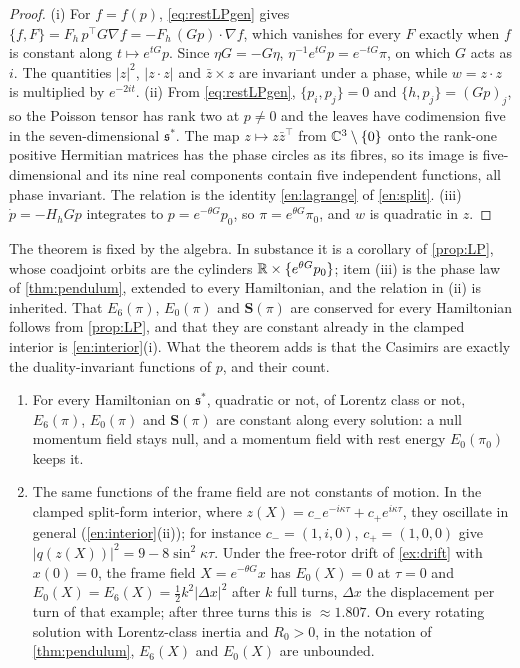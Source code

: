 \begin{proof}
(i) For $f=f(p)$, \eqref{eq:restLPgen} gives $\{f,F\}=F_h\,p^{\!\top}G\nabla f=-F_h\,(Gp)\cdot\nabla f$, which vanishes for every $F$ exactly when $f$
is constant along $t\mapsto e^{tG}p$. Since $\eta G=-G\eta$, $\eta^{-1}e^{tG}p=e^{-tG}\pi$, on which $G$ acts as $i$. The quantities $|z|^2$,
$|z\cdot z|$ and $\bar z\times z$ are invariant under a phase, while $w=z\cdot z$ is multiplied by $e^{-2it}$. (ii) From \eqref{eq:restLPgen},
$\{p_i,p_j\}=0$ and $\{h,p_j\}=(Gp)_j$, so the Poisson tensor has rank two at $p\neq0$ and the leaves have codimension five in the
seven-dimensional $\mathfrak s^*$. The map $z\mapsto z\bar z^{\!\top}$ from $\mathbb{C}^3\setminus\{0\}$ onto the rank-one positive Hermitian matrices has the
phase circles as its fibres, so its image is five-dimensional and its nine real components contain five independent functions, all phase
invariant. The relation is the identity \eqref{en:lagrange} of \cref{en:split}. (iii) $\dot p=-H_hGp$ integrates to
$p=e^{-\theta G}p_0$, so $\pi=e^{\theta G}\pi_0$, and $w$ is quadratic in $z$.
\end{proof}

The theorem is fixed by the algebra. In substance it is a corollary of \cref{prop:LP}, whose coadjoint orbits are the cylinders
$\mathbb{R}\times\{e^{\theta G}p_0\}$; item (iii) is the phase law of \cref{thm:pendulum}, extended to every Hamiltonian, and the relation in (ii) is
inherited. That $E_6(\pi)$, $E_0(\pi)$ and $\mathbf S(\pi)$ are conserved for every Hamiltonian follows from \cref{prop:LP}, and that they are constant already in the clamped
interior is \cref{en:interior}(i). What the theorem adds is that the Casimirs are exactly the duality-invariant functions of $p$, and their count.

\begin{corollary}
\label{cl:nogen}
\begin{enumerate}[label=(\roman*),leftmargin=2.2em]
\item For every Hamiltonian on $\mathfrak s^*$, quadratic or not, of Lorentz class or not, $E_6(\pi)$, $E_0(\pi)$ and $\mathbf S(\pi)$ are constant
along every solution: a null momentum field stays null, and a momentum field with rest energy $E_0(\pi_0)$ keeps it.
\item The same functions of the frame field are not constants of motion. In the clamped split-form interior, where
$z(X)=c_-e^{-i\kappa\tau}+c_+e^{i\kappa\tau}$, they oscillate in general (\cref{en:interior}(ii)); for instance $c_-=(1,i,0)$, $c_+=(1,0,0)$ give
$|q(z(X))|^2=9-8\sin^2\kappa\tau$. Under the
free-rotor drift of \cref{ex:drift} with $x(0)=0$, the frame field $X=e^{-\theta G}x$ has $E_0(X)=0$ at $\tau=0$ and
$E_0(X)=E_6(X)=\tfrac12k^2|\Delta x|^2$ after $k$ full turns, $\Delta x$ the displacement per turn of that example; after three turns this is
$\approx1.807$. On every rotating solution with Lorentz-class inertia and $R_0>0$, in the notation of \cref{thm:pendulum}, $E_6(X)$ and
$E_0(X)$ are unbounded.
\end{enumerate}
\end{corollary}

